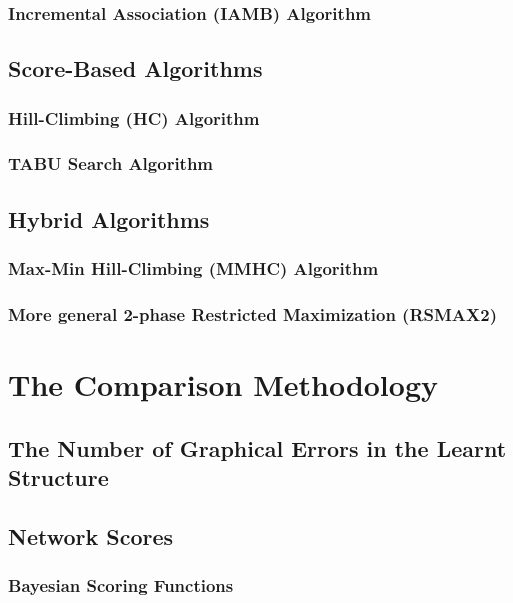 \documentclass[12pt,a4paper,oneside]{book}
\theoremstyle{plain}
\theoremstyle{definition}
\theoremstyle{remark}
\theoremstyle{definition}
\numberwithin{equation}{chapter}
\begin{document}
\subsection{Incremental Association (IAMB) Algorithm}
	

%
\section{Score-Based Algorithms}	
\subsection{Hill-Climbing (HC) Algorithm}


\subsection{TABU Search Algorithm}


%
\section{Hybrid Algorithms}
\subsection{Max-Min Hill-Climbing (MMHC) Algorithm}


\subsection{More general 2-phase Restricted Maximization (RSMAX2)}






\chapter{The Comparison Methodology}
\section{The Number of Graphical Errors in the Learnt Structure}


\section{Network Scores}


\subsection{Bayesian Scoring Functions}

\end{document}
